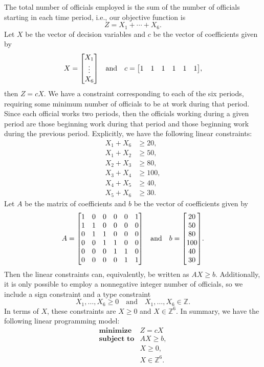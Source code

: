 \documentclass[12pt]{article}
\theoremstyle{definition}
\newcommand{\isp}[1]{\quad\text{#1}\quad}
\newcommand{\Z}{\mathbb{Z}}
\begin{document}
The total number of officials employed is the sum of the number of officials starting in each time period, i.e., our objective function is
\[
    Z = X_1 + \cdots + X_6.
\]
Let $X$ be the vector of decision variables and $c$ be the vector of coefficients given by
\[
    X = \mqty[X_1 \\ \vdots \\ X_6] \isp{and} c = \mqty[1 & 1 & 1 & 1 & 1 & 1],
\]
then $Z = cX$. We have a constraint corresponding to each of the six periods, requiring some minimum number of officials to be at work during that period. Since each official works two periods, then the officials working during a given period are those beginning work during that period and those beginning work during the previous period. Explicitly, we have the following linear constraints:
\begin{align*}
    X_1 + X_6 &\geq 20, \\
    X_1 + X_2 &\geq 50, \\
    X_2 + X_3 &\geq 80, \\
    X_3 + X_4 &\geq 100, \\
    X_4 + X_5 &\geq 40, \\
    X_5 + X_6 &\geq 30.
\end{align*}
Let $A$ be the matrix of coefficients and $b$ be the vector of coefficients given by
\[
    A = \mqty[
        1 & 0 & 0 & 0 & 0 & 1 \\
        1 & 1 & 0 & 0 & 0 & 0 \\
        0 & 1 & 1 & 0 & 0 & 0 \\
        0 & 0 & 1 & 1 & 0 & 0 \\
        0 & 0 & 0 & 1 & 1 & 0 \\
        0 & 0 & 0 & 0 & 1 & 1 \\
    ]
    \isp{and}
    b = \mqty[20 \\ 50 \\ 80 \\ 100 \\ 40 \\ 30].
\]
Then the linear constraints can, equivalently, be written as $AX \geq b$. Additionally, it is only possible to employ a nonnegative integer number of officials, so we include a sign constraint and a type constraint
\[
    X_1, \dots, X_6 \geq 0 \isp{and} X_1, \dots, X_6 \in \Z. 
\]
In terms of $X$, these constraints are $X \geq 0$ and $X \in \Z^6$. In summary, we have the following linear programming model:
\[
    \begin{array}{ll}
        \textbf{minimize}   & Z = cX \\
        \textbf{subject to} & AX \geq b, \\
                            & X \geq 0, \\
                            & X \in \Z^6.
    \end{array}
\]
\end{document}
